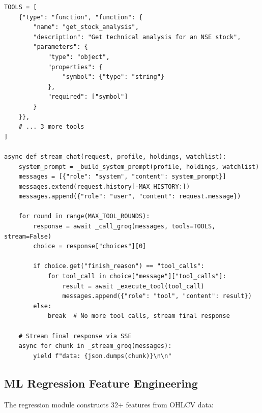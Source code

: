 \documentclass[12pt, a4paper, oneside]{report}
\begin{document}
\begin{lstlisting}[style=pythonstyle, caption={AI advisor streaming with tool-use loop (simplified)}, label={lst:ai_advisor}]
TOOLS = [
    {"type": "function", "function": {
        "name": "get_stock_analysis",
        "description": "Get technical analysis for an NSE stock",
        "parameters": {
            "type": "object",
            "properties": {
                "symbol": {"type": "string"}
            },
            "required": ["symbol"]
        }
    }},
    # ... 3 more tools
]

async def stream_chat(request, profile, holdings, watchlist):
    system_prompt = _build_system_prompt(profile, holdings, watchlist)
    messages = [{"role": "system", "content": system_prompt}]
    messages.extend(request.history[-MAX_HISTORY:])
    messages.append({"role": "user", "content": request.message})

    for round in range(MAX_TOOL_ROUNDS):
        response = await _call_groq(messages, tools=TOOLS, stream=False)
        choice = response["choices"][0]

        if choice.get("finish_reason") == "tool_calls":
            for tool_call in choice["message"]["tool_calls"]:
                result = await _execute_tool(tool_call)
                messages.append({"role": "tool", "content": result})
        else:
            break  # No more tool calls, stream final response

    # Stream final response via SSE
    async for chunk in _stream_groq(messages):
        yield f"data: {json.dumps(chunk)}\n\n"
\end{lstlisting}

\subsection{ML Regression Feature Engineering}

The regression module constructs 32+ features from OHLCV data:
\end{document}
